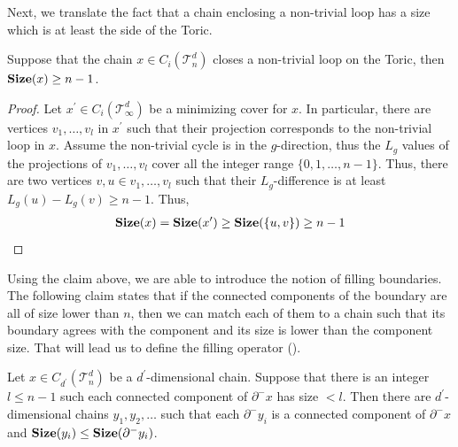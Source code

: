 Next, we translate the fact that a chain enclosing a non-trivial loop has a size which is at least the side of the Toric.
\begin{claim}
  \label{claim:sizenont}
Suppose that the chain $x \in C_{i}(\mathcal{T}_n^d)$ closes a non-trivial loop on the Toric, then $\mathbf{Size}(x) \ge n - 1$.
\end{claim}
\begin{proof}
  Let $x^{\prime} \in C_{i}(\mathcal T_\infty^d)$ be a minimizing cover for $x$. In particular, there are vertices $v_{1}, \ldots, v_{l}$ in $x^{\prime}$ such that their projection corresponds to the non-trivial loop in $x$. Assume the non-trivial cycle is in the $g$-direction, thus the $L_{g}$ values of the projections of $v_{1}, \ldots, v_{l}$ cover all the integer range $\{0,1,\ldots, n-1\}$. Thus, there are two vertices $v,u \in v_{1},\ldots,v_{l}$ such that their $L_{g}$-difference is at least $L_{g}(u) - L_{g}(v) \ge n-1$. Thus,
  \begin{equation*}
    \begin{split}
      \mathbf{Size}(x) = \mathbf{Size}(x^{\prime}) \ge \mathbf{Size}(\{u,v\}) \ge n-1
    \end{split}
  \end{equation*}
\end{proof}




Using the claim above, we are able to introduce the notion of filling boundaries. The following claim states that if the connected components of the boundary are all of size lower than $n$, then we can match each of them to a chain such that its boundary agrees with the component and its size is lower than the component size. That will lead us to define the filling operator ().
\begin{claim}
  \label{claim:fillchain}
  Let $x \in C_{d^{\prime}}(\mathcal{T}_n^d)$ be a $d^{\prime}$-dimensional chain. Suppose that there is an integer $l \le n-1$ such each connected component of $\partial^{-}x$ has size $ < l$. Then there are $d^{\prime}$-dimensional chains $y_{1}, y_{2}, \ldots$ such that each $\partial^{-}y_{i}$ is a connected component of $\partial^{-}x$ and $\mathbf{Size}(y_{i}) \le \mathbf{Size}(\partial^{-}y_{i})$.
\end{claim}

